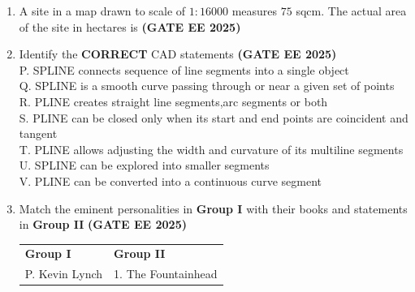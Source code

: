 \documentclass[journal,12pt,onecolumn]{IEEEtran}
\theoremstyle{remark}
\begin{document}
{\begin{enumerate}
\begin{enumerate}
    \item Elements with continuity are perceived together
\end{enumerate}
\item A site in a map drawn to scale of $1:16000$ measures $75$ sqcm. The actual area of the site in hectares is \hfill \textbf{(GATE EE 2025)}
\begin{enumerate}
\end{enumerate}
\item Identify the \textbf{CORRECT} CAD statements \hfill \textbf{(GATE EE 2025)}
\\
P. SPLINE connects sequence of line segments into a single object
\\
Q. SPLINE is a smooth curve passing through or near a given set of points
\\
R. PLINE creates straight line segments,arc segments or both
\\
S. PLINE can be closed only when its start and end points are coincident and tangent
\\
T. PLINE allows adjusting the width and curvature of its multiline segments
\\
U. SPLINE can be explored into smaller segments
\\
V. PLINE can be converted into a continuous curve segment
\begin{enumerate}
\end{enumerate}
\item Match the eminent personalities in \textbf{Group I} with their books and statements in \textbf{Group II} \hfill \textbf{(GATE EE 2025)}
\\
\begin{tabular}{p{}p{}}
\textbf{Group I}     & \textbf{Group II} \\
P. Kevin Lynch     & 1. The Fountainhead\\

\end{tabular}
\end{enumerate}}
\end{document}
